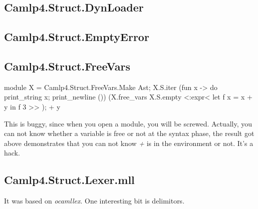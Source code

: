 \subsection{Camlp4.Struct.DynLoader}
\label{Camlp4.Struct.DynLoader}

\subsection{Camlp4.Struct.EmptyError}
\label{Camlp4.Struct.EmptyError}

\subsection{Camlp4.Struct.FreeVars}
\label{Camlp4.Struct.FreeVars}

\begin{ocamlcode}
module X = Camlp4.Struct.FreeVars.Make Ast;  
X.S.iter (fun x -> do
      {print_string x;
           print_newline ()}) (X.free_vars X.S.empty <:expr< let f x = x  + y  in f 3 >> );
+
y
\end{ocamlcode}

This is buggy, since when you open a module, you will be
screwed. Actually, you can not know whether a variable is free or not
at the syntax phase, the result got above demonstrates that you can
not know \textit{+} is in the environment or not. It's a hack.

\subsection{Camlp4.Struct.Lexer.mll}
\label{Camlp4.Struct.Lexer.mll}
It was based on \textit{ocamllex}. One interesting bit is delimitors.

